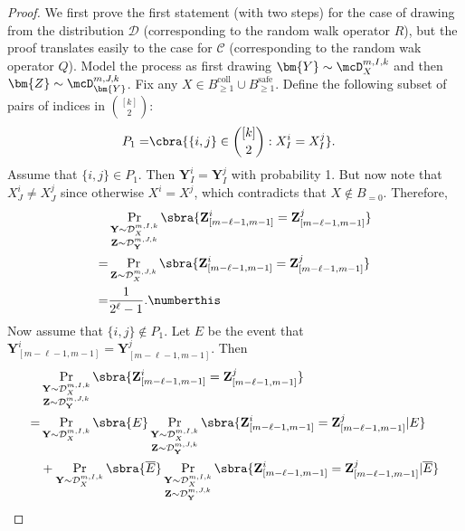 \begin{proof}
    We first prove the first statement (with two steps) for the case of drawing from the distribution $\mathcal{D}$ (corresponding to the random walk operator $R$), but the proof translates easily to the case for $\mathcal{C}$ (corresponding to the random wak operator $Q$). Model the process as first drawing $\bm{Y}\sim \mcD^{m,I,k}_X$ and then $\bm{Z}\sim \mcD^{m,J,k}_{\bm{Y}}$. Fix any $X\in B_{\geq1}^{\mathrm{coll}}\cup B_{\geq1}^{\mathrm{safe}}$. Define the following subset of pairs of indices in $\binom{[k]}{2}$:
    \begin{align*}
        P_1=& \cbra{\{i,j\}\in\binom{[k]}{2}:X^i_{I}=X^j_{I}}.
    \end{align*}
    Assume that $\{i,j\}\in P_1$. Then $\mathbf{Y}^i_I=\mathbf{Y}^j_I$ with probability 1. But now note that $X^i_{J}\neq X^j_{J}$ since otherwise $X^i=X^j$, which contradicts that $X\not\in B_{=0}$. Therefore, 
    \begin{align*}
        &\Pr_{\substack{\mathbf{Y}\sim \mathcal{D}_{X}^{m,I,k}\\\mathbf{Z}\sim\mathcal{D}_{\mathbf{Y}}^{m,J,k}}}\sbra{\mathbf{Z}^i_{[m-\ell-1,m-1]}=\mathbf{Z}^j_{[m-\ell-1,m-1]}}\\
        =&\Pr_{\substack{\mathbf{Z}\sim \mathcal{D}_{X}^{m,J,k}}}\sbra{\mathbf{Z}^i_{[m-\ell-1,m-1]}=\mathbf{Z}^j_{[m-\ell-1,m-1]}}\\
        =& \frac1{2^{\ell}-1}.\numberthis\label{eq:P1 contribution}
    \end{align*}
    Now assume that $\{i,j\}\not\in P_1$. Let $E$ be the event that $\mathbf{Y}^i_{[m-\ell-1,m-1]}=\mathbf{Y}^j_{[m-\ell-1,m-1]}$. Then 
    \begin{align*}
        &\Pr_{\substack{\mathbf{Y}\sim \mathcal{D}_{X}^{m,I,k}\\\mathbf{Z}\sim\mathcal{D}_{\mathbf{Y}}^{m,J,k}}}\sbra{\mathbf{Z}^i_{[m-\ell-1,m-1]}=\mathbf{Z}^j_{[m-\ell-1,m-1]}}\\
        =&\Pr_{\mathbf{Y}\sim \mathcal{D}_{X}^{m,I,k}}\sbra{E}\Pr_{\substack{\mathbf{Y}\sim \mathcal{D}_{X}^{m,I,k}\\\mathbf{Z}\sim\mathcal{D}_{\mathbf{Y}}^{m,J,k}}}\sbra{\mathbf{Z}^i_{[m-\ell-1,m-1]}=\mathbf{Z}^j_{[m-\ell-1,m-1]}|E}\\
        &+\Pr_{\mathbf{Y}\sim \mathcal{D}_{X}^{m,I,k}}\sbra{\overline{E}}\Pr_{\substack{\mathbf{Y}\sim \mathcal{D}_{X}^{m,I,k}\\\mathbf{Z}\sim\mathcal{D}_{\mathbf{Y}}^{m,J,k}}}\sbra{\mathbf{Z}^i_{[m-\ell-1,m-1]}=\mathbf{Z}^j_{[m-\ell-1,m-1]}|\overline{E}}\\

\end{align*}
\end{proof}
